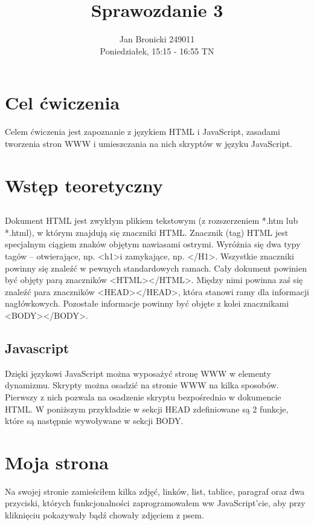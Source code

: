 \documentclass{article}
\title{Sprawozdanie 3}
\author{Jan Bronicki 249011\\Poniedziałek, 15:15 - 16:55 TN}
\date{}
\begin{document}
\maketitle

\section{Cel ćwiczenia}

Celem ćwiczenia jest zapoznanie z językiem HTML i JavaScript, zasadami tworzenia stron
WWW i umieszczania na nich skryptów w języku JavaScript.


\section{Wstęp teoretyczny}


\subsection{}
Dokument HTML jest zwykłym plikiem tekstowym (z rozszerzeniem *.htm lub *.html), w
którym znajdują się znaczniki HTML. Znacznik (tag) HTML jest specjalnym ciągiem znaków
objętym nawiasami ostrymi. Wyróżnia się dwa typy tagów – otwierające, np. \textless h1\textgreater i zamykające,
np. \textless/H1\textgreater. Wszystkie znaczniki powinny się znaleźć w pewnych standardowych ramach. Cały
dokument powinien być objęty parą znaczników \textless HTML\textgreater \textless/HTML\textgreater. Między nimi powinna zaś się
znaleźć para znaczników \textless HEAD\textgreater\textless/HEAD\textgreater, która stanowi ramy dla informacji nagłówkowych.
Pozostałe informacje powinny być objęte z kolei znacznikami \textless BODY\textgreater\textless/BODY\textgreater. 

\subsection{Javascript}
Dzięki językowi JavaScript można wyposażyć stronę WWW w elementy dynamizmu. Skrypty
można osadzić na stronie WWW na kilka sposobów. Pierwszy z nich pozwala na osadzenie
skryptu bezpośrednio w dokumencie HTML. W poniższym przykładzie w sekcji HEAD
zdefiniowane są 2 funkcje, które są następnie wywoływane w sekcji BODY.


\section{Moja strona}
Na swojej stronie zamieściłem kilka zdjęć, linków, list, tablice, paragraf oraz dwa przyciski, których funkcjonalności zaprogramowałem ww JavaScript'cie, aby przy kliknięciu pokazywały bądź chowały zdjęciem z psem.
\end{document}
